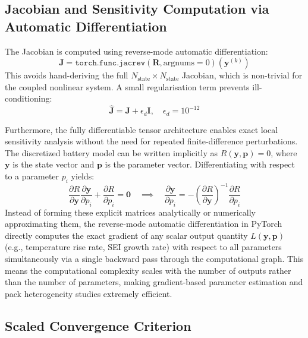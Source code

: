 \subsection{Jacobian and Sensitivity Computation via Automatic Differentiation}

The Jacobian is computed using reverse-mode automatic differentiation:
\begin{equation}
  \mathbf{J} = \texttt{torch.func.jacrev}(\mathbf{R}, \text{argnums}=0)(\mathbf{y}^{(k)})
  \label{eq:ad_jacobian}
\end{equation}
This avoids hand-deriving the full $N_\text{state} \times N_\text{state}$ Jacobian, which is non-trivial for the coupled nonlinear system. A small regularisation term prevents ill-conditioning:
\begin{equation}
  \hat{\mathbf{J}} = \mathbf{J} + \epsilon_d \mathbf{I}, \quad \epsilon_d = 10^{-12}
  \label{eq:jac_regularise}
\end{equation}

Furthermore, the fully differentiable tensor architecture enables exact local sensitivity analysis without the need for repeated finite-difference perturbations. The discretized battery model can be written implicitly as $R(\mathbf{y}, \mathbf{p})=0$, where $\mathbf{y}$ is the state vector and $\mathbf{p}$ is the parameter vector. Differentiating with respect to a parameter $p_i$ yields:
\begin{equation}
  \frac{\partial R}{\partial \mathbf{y}}\frac{\partial \mathbf{y}}{\partial p_i} + \frac{\partial R}{\partial p_i} = \mathbf{0} \quad \implies \quad \frac{\partial \mathbf{y}}{\partial p_i} = - \left( \frac{\partial R}{\partial \mathbf{y}} \right)^{-1} \frac{\partial R}{\partial p_i}
\end{equation}
Instead of forming these explicit matrices analytically or numerically approximating them, the reverse-mode automatic differentiation in PyTorch directly computes the exact gradient of any scalar output quantity $L(\mathbf{y}, \mathbf{p})$ (e.g., temperature rise rate, SEI growth rate) with respect to all parameters simultaneously via a single backward pass through the computational graph. This means the computational complexity scales with the number of outputs rather than the number of parameters, making gradient-based parameter estimation and pack heterogeneity studies extremely efficient.

\subsection{Scaled Convergence Criterion}

